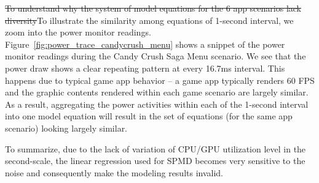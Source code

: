 
\st{To understand why the system of model equations for the 6 app scenarios lack
diversity}{\color{blue}To illustrate the similarity among equations of 1-second interval}, we zoom into the power monitor readings.
Figure~\ref{fig:power_trace_candycrush_menu} shows a snippet of the power monitor
readings during the Candy Crush Saga Menu scenario. We see that the power draw
shows a clear repeating pattern at every 16.7ms interval. This happens due to
typical game app behavior -- a game app typically renders 60 FPS and the graphic
contents rendered within each game scenario are largely similar. As a result,
aggregating the power activities within each of the 1-second interval into one
model equation will result in the set of equations (for the same app scenario)
looking largely similar.

{\color{blue}To summarize, due to the lack of variation of CPU/GPU utilization level in the second-scale, the linear regression used for SPMD becomes very sensitive to the noise and consequently make the modeling results invalid.}

